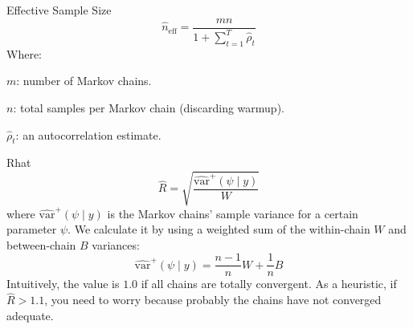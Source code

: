 \begin{frame}{Effective Sample Size \parencite{gelman2013bayesian}}
    $$\widehat{n}_{\text{eff}} = \frac{mn}{1 + \sum_{t=1}^T \widehat{\rho}_t}$$
    Where:
    \begin{vfilleditems}
        \item $m$: number of Markov chains.
        \item $n$: total samples per Markov chain (discarding warmup).
        \item $\widehat{\rho}_t$: an autocorrelation estimate.
    \end{vfilleditems}
\end{frame}

\begin{frame}{Rhat \parencite{gelman2013bayesian}}
    $$\widehat{R} = \sqrt{\frac{\widehat{\text{var}}^+(\psi \mid y)}{W}}$$
    where $\widehat{\text{var}}^+(\psi \mid y)$ is the Markov chains' sample variance
    for a certain parameter $\psi$.
    We calculate it by using a weighted sum of the within-chain $W$
    and between-chain $B$ variances:
    $$\widehat{\text{var}}^+(\psi \mid y) = \frac{n-1}{n} W + \frac{1}{n} B$$
    \vfill
    Intuitively, the value is $1.0$ if all chains are totally convergent.
    As a heuristic, if $\widehat{R} > 1.1$,
    you need to worry because probably the chains have not converged adequate.
\end{frame}





